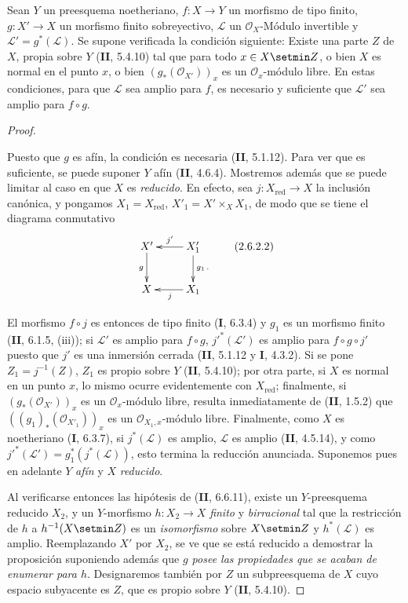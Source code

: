 \begin{proposition}[2.6.2]
\label{III.2.6.2-fr}
Sean $Y$ un preesquema noetheriano, $f:X\to Y$ un morfismo de tipo
finito, $g:X'\to X$ un morfismo finito sobreyectivo, $\mathcal L$ un
$\mathcal O_X$-Módulo invertible y $\mathcal L'=g^*(\mathcal L)$. Se
supone verificada la condición siguiente: Existe una parte $Z$ de
$X$, propia sobre $Y$ (\textbf{II}, 5.4.10) tal que para todo $x\in X\setmin Z$, o bien
$X$ es normal en el punto $x$, o bien $(g_*(\mathcal O_{X'}))_x$ es un
$\mathcal O_x$-módulo libre. En estas condiciones, para que $\mathcal L$
sea amplio para $f$, es necesario y suficiente que $\mathcal L'$ sea amplio
para $f\circ g$.
\end{proposition}

\begin{proof}
\begin{env}[2.6.2.1]
\label{III.2.6.2.1-fr}
Puesto que $g$ es afín, la condición es necesaria (\textbf{II}, 5.1.12). Para
ver que es suficiente, se puede suponer $Y$ afín (\textbf{II}, 4.6.4).
Mostremos además que se puede limitar al caso en que $X$ es \emph{reducido}. En
efecto, sea $j:X_{\mathrm{red}}\to X$ la inclusión canónica, y pongamos
$X_1=X_{\mathrm{red}}$, $X'_1=X'\times_X X_1$, de modo que se tiene el
diagrama conmutativo
\[
\xymatrix{
X'\ar[d]_g & X'_1\ar[l]_{j'}\ar[d]^{g_1\, .}\\
X & X_1\ar[l]^{j}
}
\tag{2.6.2.2}\label{III.2.6.2.2-fr}
\]

El morfismo $f\circ j$ es entonces de tipo finito (\textbf{I}, 6.3.4) y $g_1$ es
un morfismo finito (\textbf{II}, 6.1.5, (iii)); si $\mathcal L'$ es amplio para
$f\circ g$, $j'^*(\mathcal L')$ es amplio para $f\circ g\circ j'$ puesto que
$j'$ es una inmersión cerrada (\textbf{II}, 5.1.12 y \textbf{I}, 4.3.2). Si se pone
$Z_1=j^{-1}(Z)$, $Z_1$ es propio sobre $Y$ (\textbf{II}, 5.4.10); por otra parte,
si $X$ es normal en un punto $x$, lo mismo ocurre evidentemente con
$X_{\mathrm{red}}$; finalmente, si $(g_*(\mathcal O_{X'}))_x$ es un
$\mathcal O_x$-módulo libre, resulta inmediatamente de (\textbf{II}, 1.5.2) que
$((g_1)_*(\mathcal O_{X'_1}))_x$ es un $\mathcal O_{X_1,x}$-módulo
libre. Finalmente, como $X$ es noetheriano (\textbf{I}, 6.3.7), si
$j^*(\mathcal L)$ es amplio, $\mathcal L$ es amplio (\textbf{II}, 4.5.14), y
como $j'^*(\mathcal L')=g_1^*(j^*(\mathcal L))$, esto termina la
reducción anunciada. Suponemos pues en adelante $Y$ \emph{afín} y $X$
\emph{reducido}.
\end{env}

Al verificarse entonces las hipótesis de (\textbf{II}, 6.6.11), existe un
$Y$-preesquema reducido $X_2$, y un $Y$-morfismo $h:X_2\to X$ \emph{finito} y
\emph{birracional} tal que la restricción de $h$ a $h^{-1}(X\setmin Z)$ es un
\emph{isomorfismo} sobre $X\setmin Z$ y $h^*(\mathcal L)$ es amplio. Reemplazando
$X'$ por $X_2$, se ve que se está reducido a demostrar la proposición
suponiendo además que \emph{$g$ posee las propiedades que se acaban de
enumerar para $h$}. Designaremos también por $Z$ un subpreesquema de
$X$ cuyo espacio subyacente es $Z$, que es propio sobre $Y$
(\textbf{II}, 5.4.10).


\end{proof}

